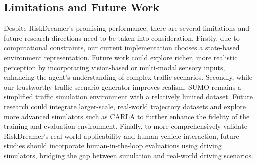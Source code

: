 \subsection{Limitations and Future Work}
Despite RiskDreamer's promising performance, there are several limitations and future research directions need to be taken into consideration. Firstly, due to computational constraints, our current implementation chooses a state-based environment representation.  Future work could explore richer, more realistic perception by incorporating vision-based or multi-modal sensory inputs, enhancing the agent's understanding of complex traffic scenarios. Secondly, while our trustworthy traffic scenario generator improves realism, SUMO remains a simplified traffic simulation environment with a relatively limited dataset.  Future research could integrate larger-scale, real-world trajectory datasets and explore more advanced simulators such as CARLA to further enhance the fidelity of the training and evaluation environment.  Finally, to more comprehensively validate RiskDreamer's real-world applicability and human-vehicle interaction, future studies should incorporate human-in-the-loop evaluations using driving simulators, bridging the gap between simulation and real-world driving scenarios.